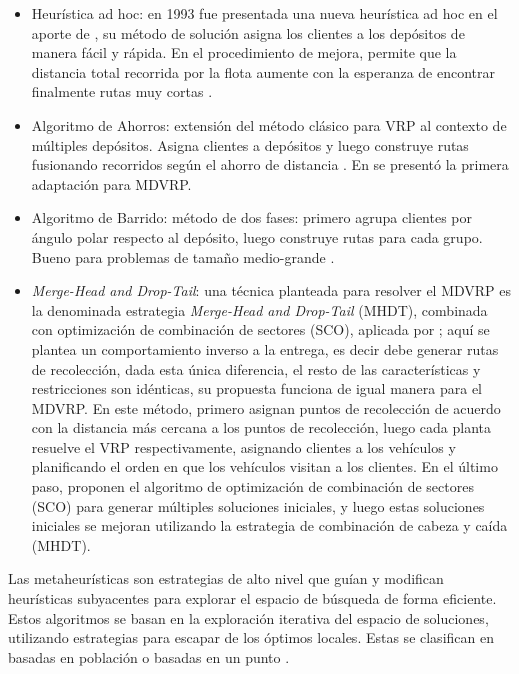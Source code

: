 \begin{itemize}
  \item Heurística ad hoc: en 1993 fue presentada una nueva heurística ad hoc en el aporte de \parencite{chaoNewHeuristicMultidepot1993}, su método de solución asigna los clientes a los depósitos de manera fácil y rápida. En el procedimiento de mejora, permite que la distancia total recorrida por la flota aumente con la esperanza de encontrar finalmente rutas muy cortas \parencite{colinDisenoAlgoritmoMetaheuristico2024}.
  \item Algoritmo de Ahorros: extensión del método clásico para VRP al contexto de múltiples depósitos. Asigna clientes a depósitos y luego construye rutas fusionando recorridos según el ahorro de distancia \parencite{clarkeSchedulingVehiclesCentral1964}. En  \parencite{tillmanMultipleTerminalDelivery1969} se presentó la primera adaptación para MDVRP.
  \item Algoritmo de Barrido: método de dos fases: primero agrupa clientes por ángulo polar respecto al depósito, luego construye rutas para cada grupo. Bueno para problemas de tama\~no medio-grande \parencite{gillettHeuristicAlgorithmVehicledispatch1974}.
  \item \textit{Merge-Head and Drop-Tail}: una técnica planteada para resolver el MDVRP es la denominada estrategia \textit{Merge-Head and Drop-Tail} (MHDT), combinada con optimización de combinación de sectores (SCO), aplicada por  \parencite{shiHeuristicSolutionMethod2020}; aquí se plantea un comportamiento inverso a la entrega, es decir debe generar rutas de recolección, dada esta única diferencia, el resto de las características y restricciones son idénticas, su propuesta funciona de igual manera para el MDVRP. En este método, primero asignan puntos de recolección de acuerdo con la distancia más cercana a los puntos de recolección, luego cada planta resuelve el VRP respectivamente, asignando clientes a los vehículos y planificando el orden en que los vehículos visitan a los clientes. En el último paso, proponen el algoritmo de optimización de combinación de sectores (SCO) para generar múltiples soluciones iniciales, y luego estas soluciones iniciales se mejoran utilizando la estrategia de combinación de cabeza y caída (MHDT).
\end{itemize}

Las metaheurísticas son estrategias de alto nivel que guían y modifican heurísticas subyacentes para explorar el espacio de búsqueda de forma eficiente. Estos algoritmos se basan en la exploración iterativa del espacio de soluciones, utilizando estrategias para escapar de los óptimos locales. Estas se clasifican en basadas en población o basadas en un punto  \parencite{blumMetaheuristicsCombinatorialOptimization2003}.

